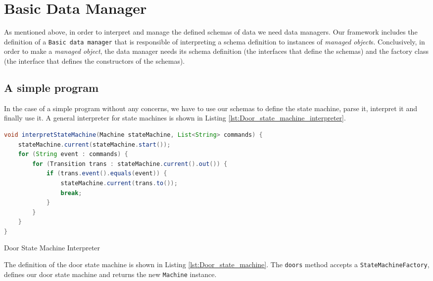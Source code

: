 \section{Basic Data Manager}
As mentioned above, in order to interpret and manage the defined schemas of data we need data managers. 
Our framework includes the definition of a \texttt{Basic data manager} that is responsible of interpreting a schema definition to instances of \textit{managed object}s.
Conclusively, in order to make a \textit{managed object}, the data manager needs its schema definition (the interfaces that define the schemas) and the factory class (the interface that defines the constructors of the schemas).

\subsection{A simple program}
In the case of a simple program without any concerns, we have to use our schemas to define the state machine, parse it, interpret it and finally use it. A general interpreter for state machines is shown in Listing \ref{lst:Door_state_machine_interpreter}.

\begin{sourcecode} [H]
	\begin{lstlisting}[language=Java, escapechar=|]
void interpretStateMachine(Machine stateMachine, List<String> commands) {
	stateMachine.current(stateMachine.start());
	for (String event : commands) {
		for (Transition trans : stateMachine.current().out()) {
			if (trans.event().equals(event)) {
				stateMachine.current(trans.to());
				break;
			}
		}
	}
}
	\end{lstlisting}
	\caption{Door State Machine Interpreter}
	\label{lst:Door_state_machine_interpreter}
\end{sourcecode}

The definition of the door state machine is shown in Listing \ref{lst:Door_state_machine}.
The \texttt{doors} method accepts a \texttt{StateMachineFactory}, defines our door state machine and returns the new \texttt{Machine} instance.

